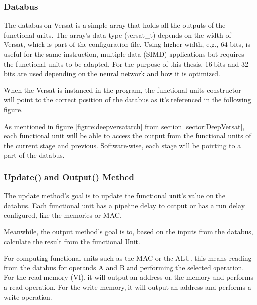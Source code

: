 \documentclass[conference]{IEEEtran}
\begin{document}
\subsubsection{Databus}

The databus on Versat is a simple array that holds all the outputs of the functional units.
The array's data type (versat\_t) depends on the width of Versat, which is part of the configuration file.
Using higher width, e.g., 64 bits, is useful for the same instruction, multiple data (SIMD) 
applications but requires the functional units to be adapted.
For the purpose of this thesis, 16 bits and 32 bits are used depending 
on the neural network and how it is optimized.

When the Versat is instanced in the program, the functional units constructor will point
to the correct position of the databus as it's referenced in the following figure.

As mentioned in figure \ref{figure:deepversatarch} from section \ref{sector:DeepVersat}, 
each functional unit will be able to access the output from the functional units of the
current stage and previous. Software-wise, each stage will be pointing to a part of the databus.  



\subsubsection{Update() and Output() Method}


The update method's goal is to update the functional unit's value on the databus. 
Each functional unit has a pipeline delay to output or has a run delay configured, 
like the memories or MAC.

Meanwhile, the output method's goal is to, based on the inputs from the databus, calculate the result from
 the functional Unit.

 For computing functional units such as the MAC or the ALU, this means reading from the databus for operands A and B
 and performing the selected operation. For the read memory (VI), it will output an address on the memory
 and performs a read operation. For the write memory, it will output an address and performs a write operation.


% 
\end{document}
